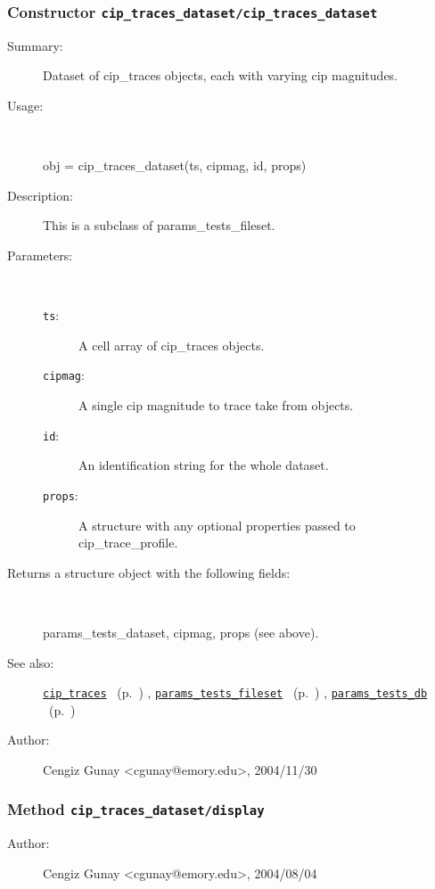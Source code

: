 \subsubsection[Constructor \texttt{cip\_traces\_dataset}]{Constructor \texttt{cip\_traces\_dataset/cip\_traces\_dataset}}%
%
\label{ref_cip_traces_dataset__cip_traces_dataset}%
\hypertarget{ref_cip_traces_dataset__cip_traces_dataset}{}%
\begin{description}
\item[Summary:]Dataset of cip\_traces objects, each with varying cip magnitudes.
%
\item[Usage:]~%
\begin{lyxcode}%
obj = cip\_traces\_dataset(ts, cipmag, id, props)
%
\end{lyxcode}%
%
\item[Description:]%
This is a subclass of params\_tests\_fileset.
\item[Parameters:]~
\begin{description}%
\item[\texttt{ts}:]
 A cell array of cip\_traces objects.
\item[\texttt{cipmag}:]
 A single cip magnitude to trace take from objects.
\item[\texttt{id}:]
 An identification string for the whole dataset.
\item[\texttt{props}:]
 A structure with any optional properties passed to cip\_trace\_profile.
\end{description}%
%
\item[Returns a structure object with the following fields:]~

	params\_tests\_dataset,
	cipmag, props (see above).
%
%
\item[See also:]%
\hyperlink{ref_cip_traces}{\texttt{cip\_traces}}%
\ (p.~\pageref{ref_cip_traces})%
%
, \hyperlink{ref_params_tests_fileset}{\texttt{params\_tests\_fileset}}%
\ (p.~\pageref{ref_params_tests_fileset})%
%
, \hyperlink{ref_params_tests_db}{\texttt{params\_tests\_db}}%
\ (p.~\pageref{ref_params_tests_db})%
%
%
\item[Author:]%
Cengiz Gunay <cgunay@emory.edu>, 2004/11/30%
\end{description}
\methodline%
\subsubsection[Method \texttt{display}]{Method \texttt{cip\_traces\_dataset/display}}%
%
\label{ref_cip_traces_dataset__display}%
\hypertarget{ref_cip_traces_dataset__display}{}%
\begin{description}
%
%
%
%
%
%
%
\item[Author:]%
Cengiz Gunay <cgunay@emory.edu>, 2004/08/04%
\end{description}
\methodline%
